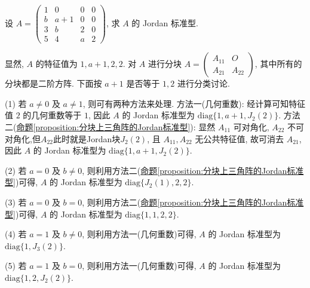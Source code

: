 \documentclass[../../main.tex]{subfiles}%
\begin{document}
\begin{example}
设 $A = \begin{pmatrix}
1 & 0 & 0 & 0 \\
b & a + 1 & 0 & 0 \\
3 & b & 2 & 0 \\
5 & 4 & a & 2
\end{pmatrix}$, 求 $A$ 的 Jordan 标准型.
\end{example}
\begin{solution}
显然, $A$ 的特征值为 $1,a + 1,2,2$. 对 $A$ 进行分块 $A = \begin{pmatrix}A_{11} & O \\ A_{21} & A_{22}\end{pmatrix}$, 其中所有的分块都是二阶方阵. 下面按 $a + 1$ 是否等于 $1,2$ 进行分类讨论.

(1) 若 $a \neq 0$ 及 $a \neq 1$, 则可有两种方法来处理. {\heiti 方法一}(几何重数): 经计算可知特征值 $2$ 的几何重数等于 $1$, 因此 $A$ 的 Jordan 标准型为 $\mathrm{diag}\{1,a + 1,J_2(2)\}$. {\heiti 方法二}(\hyperref[proposition:分块上三角阵的Jordan标准型]{命题\ref{proposition:分块上三角阵的Jordan标准型}}): 显然 $A_{11}$ 可对角化, $A_{22}$ 不可对角化,但$A_{22}$此时就是Jordan块$J_2(2)$, 且 $A_{11},A_{22}$ 无公共特征值, 故可消去 $A_{21}$, 因此 $A$ 的 Jordan 标准型为 $\mathrm{diag}\{1,a + 1,J_2(2)\}$.

(2) 若 $a = 0$ 及 $b \neq 0$, 则利用{\heiti 方法二}(\hyperref[proposition:分块上三角阵的Jordan标准型]{命题\ref{proposition:分块上三角阵的Jordan标准型}})可得, $A$ 的 Jordan 标准型为 $\mathrm{diag}\{J_2(1),2,2\}$.

(3) 若 $a = 0$ 及 $b = 0$, 则利用{\heiti 方法二}(\hyperref[proposition:分块上三角阵的Jordan标准型]{命题\ref{proposition:分块上三角阵的Jordan标准型}})可得, $A$ 的 Jordan 标准型为 $\mathrm{diag}\{1,1,2,2\}$.

(4) 若 $a = 1$ 及 $b \neq 0$, 则利用{\heiti 方法一}(几何重数)可得, $A$ 的 Jordan 标准型为 $\mathrm{diag}\{1,J_3(2)\}$.

(5) 若 $a = 1$ 及 $b = 0$, 则利用{\heiti 方法一}(几何重数)可得, $A$ 的 Jordan 标准型为 $\mathrm{diag}\{1,2,J_2(2)\}$. 

\end{solution}
\end{document}
